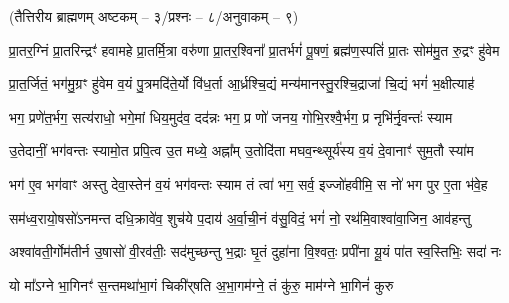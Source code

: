 

\vspace{-1ex}
\centerline{\scriptsize(तैत्तिरीय ब्राह्मणम् अष्टकम् – ३/प्रश्नः – ८/अनुवाकम् – ९)}

\begingroup\newcommand{\ShlokaStrut}{\vphantom{र्क॑हु॒}}

\twolineshloka
{\ShlokaStrut{}प्रा॒तर॒ग्निं प्रा॒तरिन्द्रꣳ॑ हवामहे प्रा॒तर्मि॒त्रा वरु॑णा प्रा॒तर॒श्विना᳚}
{\ShlokaStrut{}प्रा॒तर्भगं॑ पू॒षणं॒ ब्रह्म॑ण॒स्पतिं॑ प्रा॒तः सोम॑मु॒त रु॒द्रꣳ हु॑वेम}

\twolineshloka
{\ShlokaStrut{}प्रा॒त॒र्जितं॒ भग॑मु॒ग्रꣳ हु॑वेम व॒यं पु॒त्रमदि॑ते॒र्यो वि॑ध॒र्ता}
{\ShlokaStrut{}आ॒र्ध्रश्चि॒द्यं मन्य॑मानस्तु॒रश्चि॒द्राजा॑ चि॒द्यं भगं॑ भ॒क्षीत्याह॑}

\twolineshloka
{\ShlokaStrut{}भग॒ प्रणे॑त॒र्भग॒ सत्य॑राधो॒ भगे॒मां धिय॒मुद॑व॒ दद॑न्नः}
{\ShlokaStrut{}भग॒ प्र णो॑ जनय॒ गोभि॒रश्वै॒र्भग॒ प्र नृभि॑र्नृ॒वन्तः॑ स्याम}

\twolineshloka
{\ShlokaStrut{}उ॒तेदानीं॒ भग॑वन्तः स्यामो॒त प्रपि॒त्व उ॒त मध्ये॒ अह्ना᳚म्}
{\ShlokaStrut{}उ॒तोदि॑ता मघव॒न्थ्सूर्य॑स्य व॒यं दे॒वानाꣳ॑ सुम॒तौ स्या॑म}

\twolineshloka
{\ShlokaStrut{}भग॑ ए॒व भग॑वाꣳ अस्तु देवा॒स्तेन॑ व॒यं भग॑वन्तः स्याम}
{\ShlokaStrut{}तं त्वा॑ भग॒ सर्व॒ इज्जो॑हवीमि॒ स नो॑ भग पुर ए॒ता भ॑वे॒ह}

\twolineshloka
{\ShlokaStrut{}सम॑ध्व॒रायो॒षसो॑ऽनमन्त दधि॒क्रावे॑व॒ शुच॑ये प॒दाय॑}
{\ShlokaStrut{}अ॒र्वा॒ची॒नं व॑सु॒विदं॒ भगं॑ नो॒ रथ॑मि॒वाश्वा॑वा॒जिन॒ आव॑हन्तु}

\twolineshloka
{\ShlokaStrut{}अश्वा॑वती॒र्गोम॑तीर्न उ॒षासो॑ वी॒रव॑तीः॒ सद॑मुच्छन्तु भ॒द्राः}
{\ShlokaStrut{}घृ॒तं दुहा॑ना वि॒श्वतः॒ प्रपी॑ना यू॒यं पा॑त स्व॒स्तिभिः॒ सदा॑ नः}

\twolineshloka
{\ShlokaStrut{}यो मा᳚ऽग्ने भा॒गिनꣳ॑ स॒न्तमथा॑भा॒गं चिकी॑र्‌षति}
{\ShlokaStrut{}अ॒भा॒गम॑ग्ने॒ तं कु॑रु॒ माम॑ग्ने भा॒गिनं॑ कुरु}

\endgroup